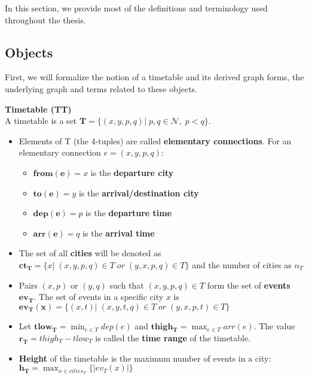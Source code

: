 In this section, we provide most of the definitions and terminology used throughout the thesis. 

	\subsection{Objects}

	First, we will formalize the notion of a timetable and its derived graph forms, the underlying graph and terms related to these objects.
	
	\begin{definition}
        \textbf{Timetable (TT)} \\
        A timetable is a set $\bm{T} = \{(x, y, p, q)| \; p, q \in \mathcal{N}, \; p < q \}$.
        \begin{itemize}
        	\item Elements of T (the 4-tuples) are called \textbf{elementary connections}. For an elementary connection $e = (x, y, p, q)$:
        	\begin{itemize}
        		\item $\bm{from(e)} = x$ is the \textbf{departure city}
        		\item $\bm{to(e)} = y$ is the \textbf{arrival/destination city}
        		\item $\bm{dep(e)} = p$ is the \textbf{departure time}
        		\item $\bm{arr(e)} = q$ is the \textbf{arrival time}
        	\end{itemize}
        	\item The set of all \textbf{cities} will be denoted as $\bm{ct_{T}} = \{x| \; (x, y, p, q) \in T \; or \; (y, x, p, q) \in T\}$ and the number of cities as $n_{T}$
        	\item Pairs $(x, p)$ or $(y, q)$ such that $(x, y, p, q) \in T$ form the set of \textbf{events} $\bm{ev_{T}}$. The set of events in a specific city $x$ is $\bm{ev_{T}(x)} = \{(x, t)| \; (x, y, t, q) \in T \; or \; (y, x, p, t) \in T\}$
        	\item Let $\bm{tlow_{T}} = \min_{e \in T} dep(e)$ and $\bm{thigh_{T}} = \max_{e \in T} arr(e)$. The value $\bm{r_{T}} = thigh_{T} - tlow_{T}$ is called the \textbf{time range} of the timetable.
        	\item \textbf{Height} of the timetable is the maximum number of events in a city: $\bm{h_{T}} = \max_{x \in cities_{T}} \{|ev_{T}(x)|\}$
        \end{itemize}
    \end{definition}
    
